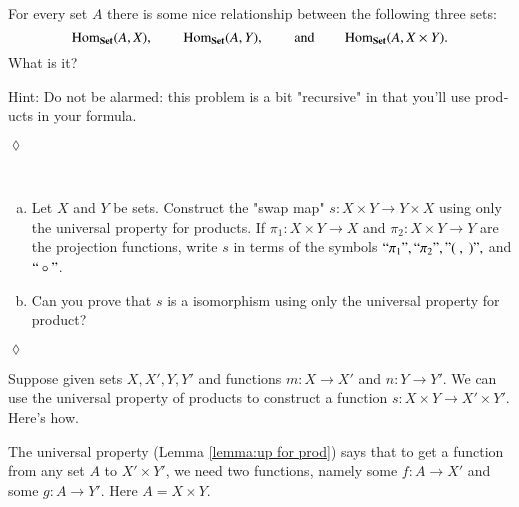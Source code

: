\documentclass{book}
\def\tn{\textnormal}
\def\Hom{\tn{Hom}}
\def\hsp{\hspace{.3in}}
\def\to{\rightarrow}
\def\taking{\colon}
\def\Set{{\bf Set}}
\theoremstyle{theoremENG}
\theoremstyle{lemmaENG}
\theoremstyle{propositionENG}
\theoremstyle{corollaryENG}
\theoremstyle{factENG}
\theoremstyle{remarkENG}
\theoremstyle{exampleENG}
\newtheorem{exampleENG}[subsubsection]{\begin{english}Example\end{english}}
\theoremstyle{warningENG}
\theoremstyle{questionENG}
\theoremstyle{guessENG}
\theoremstyle{answerENG}
\theoremstyle{constructionENG}
\theoremstyle{rulesENG}
\theoremstyle{excENG}
\newtheorem{excENG}[subsubsection]{\begin{english}Exercise\end{english}}
\theoremstyle{appENG}
\theoremstyle{definitionENG}
\theoremstyle{notationENG}
\theoremstyle{conjectureENG}
\theoremstyle{postulateENG}
\newenvironment{exerciseENG}{\begin{excENG}}{\hspace*{\fill}$\lozenge$\end{excENG}}
\theoremstyle{theoremRUS}
\theoremstyle{lemmaRUS}
\theoremstyle{propositionRUS}
\theoremstyle{corollaryRUS}
\theoremstyle{factRUS}
\theoremstyle{remarkRUS}
\theoremstyle{exampleRUS}
\theoremstyle{warningRUS}
\theoremstyle{questionRUS}
\theoremstyle{guessRUS}
\theoremstyle{answerRUS}
\theoremstyle{constructionRUS}
\theoremstyle{rulesRUS}
\theoremstyle{excRUS}
\theoremstyle{appRUS}
\theoremstyle{definitionRUS}
\theoremstyle{notationRUS}
\theoremstyle{conjectureRUS}
\theoremstyle{postulateRUS}
\def\sexc{\begin{enumerate}[a.)]\setlength{\itemsep}{.1cm}\setlength{\parskip}{.1cm}\item}
\def\next{\item}
\def\endsexc{\end{enumerate}}
\begin{document}
\begin{english}
\begin{exerciseENG}

For every set $A$ there is some nice relationship between the following three sets: $$\Hom_{\Set}(A,X), \hsp \Hom_\Set(A,Y), \hsp \text{and} \hsp\Hom_\Set(A,X\times Y).$$ What is it?

\begin{russian} \end{russian}

Hint: Do not be alarmed: this problem is a bit "recursive" in that you'll use products in your formula.

\begin{russian} \end{russian}

\end{exerciseENG}

\begin{exerciseENG}~

\sexc Let $X$ and $Y$ be sets. Construct the "swap map" $s\taking X\times Y\to Y\times X$ using only the universal property for products. If $\pi_1\taking X\times Y\to X$ and $\pi_2\taking X\times Y\to Y$ are the projection functions, write $s$ in terms of the symbols $``\pi_1",``\pi_2", "(\ ,\ )",$ and $``\circ"$. 
\next Can you prove that $s$ is a isomorphism using only the universal property for product?
\endsexc

\begin{russian} \end{russian}

\end{exerciseENG}

\begin{exampleENG}\label{ex:product to product}

Suppose given sets $X,X', Y, Y'$ and functions $m\taking X\to X'$ and $n\taking Y\to Y'$. We can use the universal property of products to construct a function $s\taking X\times Y\to X'\times Y'$.  Here's how.

\begin{russian} \end{russian}

The universal property (Lemma \ref{lemma:up for prod}) says that to get a function from any set $A$ to $X'\times Y'$, we need two functions, namely some $f\taking A\to X'$ and some $g\taking A\to Y'$. Here $A=X\times Y$. 

\begin{russian} \end{russian}


\end{exampleENG}
\end{english}
\end{document}
